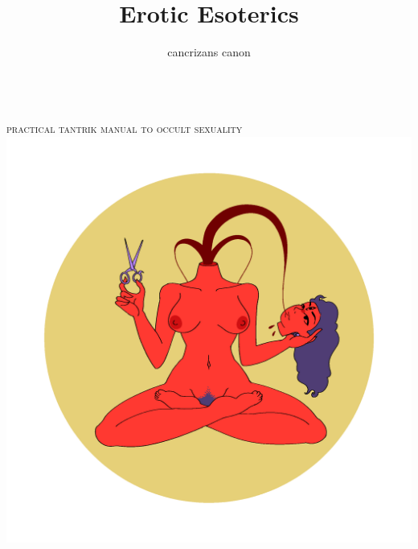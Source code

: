 \documentclass[a4paper,14pt]{memoir}
\begin{document}
\title{Erotic Esoterics}
\author{cancrizans canon}

\makeatletter
\begin{titlingpage}
\pagecolor{black}
\color{white}

\centering
{\bfseries\fontsize{50}{60}\selectfont \@title}\\[\baselineskip]
{\scshape practical tantrik manual to occult sexuality}\\[\baselineskip]

\includegraphics[width=6in]{chinna.png}

{\large\scshape \@author}
\afterpage{\nopagecolor}
\end{titlingpage}
\end{document}
